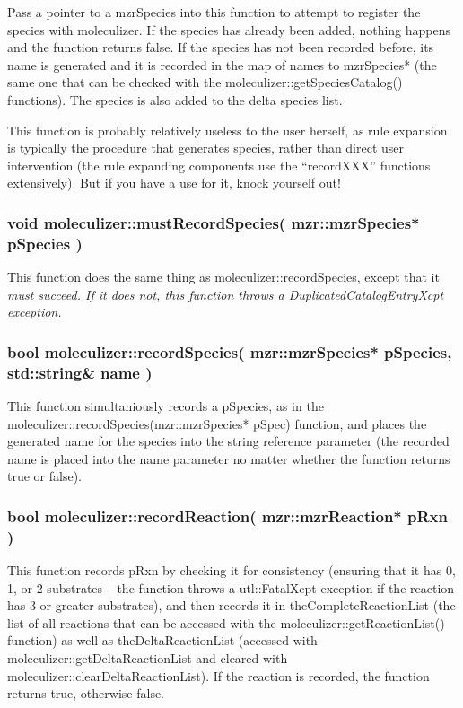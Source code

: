 Pass a pointer to a mzrSpecies into this function to attempt to
register the species with moleculizer.  If the species has already
been added, nothing happens and the function returns false.  If the
species has not been recorded before, its name is generated and it is
recorded in the map of names to mzrSpecies* (the same one that can be
checked with the moleculizer::getSpeciesCatalog() functions).  The
species is also added to the delta species list.  

This function is probably relatively useless to the user herself,
as rule expansion is typically the procedure that generates species,
rather than direct user intervention (the rule expanding components
use the ``recordXXX'' functions extensively).  But if you have a use
for it, knock yourself out!

\subsubsection{void moleculizer::mustRecordSpecies( mzr::mzrSpecies*
  pSpecies )}

This function does the same thing as moleculizer::recordSpecies,
except that it \em{must} succeed.  If it does not, this function
throws a DuplicatedCatalogEntryXcpt exception.

\subsubsection{bool moleculizer::recordSpecies( mzr::mzrSpecies*
  pSpecies, std::string\& name )}
This function simultaniously records a pSpecies, as in the
moleculizer::recordSpecies(mzr::mzrSpecies* pSpec) function, and
places the generated name for the species into the string reference
parameter (the recorded name is placed into the name parameter no
matter whether the function returns true or false).

\subsubsection{bool moleculizer::recordReaction( mzr::mzrReaction* pRxn
  )}

This function records pRxn by checking it for consistency (ensuring
that it has 0, 1, or 2 substrates -- the function throws a
utl::FatalXcpt exception if the reaction has 3 or greater substrates),
and then records it in theCompleteReactionList (the list of all
reactions that can be accessed with the moleculizer::getReactionList()
function) as well as theDeltaReactionList (accessed with
moleculizer::getDeltaReactionList and cleared with
moleculizer::clearDeltaReactionList).  If the reaction is recorded,
the function returns true, otherwise false. 

